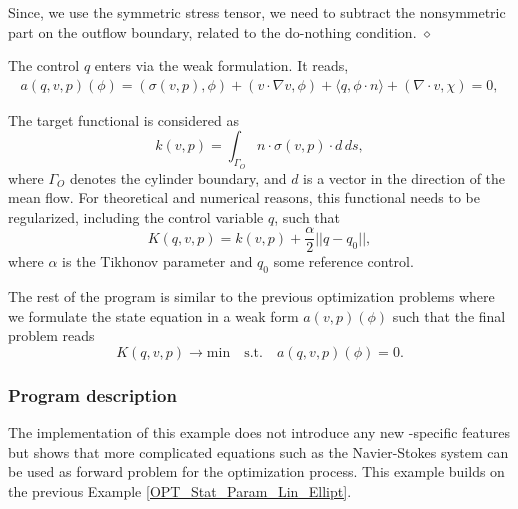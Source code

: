 \begin{remark} Since, we use the 
symmetric stress tensor, we need to subtract the nonsymmetric part 
on the outflow boundary, related to the do-nothing condition.
$\diamond$
\end{remark}

The control $q$ enters via the weak formulation. It reads,
\begin{align*}
a(q,v,p)(\phi) = (\sigma(v,p), \phi) + (v\cdot \nabla v, \phi) 
+ \langle q, \phi\cdot n \rangle + (\nabla\cdot v, \chi) = 0,
\end{align*}




The target functional is considered as 
\[
k(v,p) = \int_{\Gamma_O} n\cdot \sigma(v,p)\cdot d \, ds,
\]
where $\Gamma_O$ denotes the cylinder boundary, and $d$ is a vector in the
direction
of the mean flow. For theoretical and numerical reasons, this functional 
needs to be regularized, including the control variable $q$, such that
\[
K(q,v,p) = k(v,p) + \frac{\alpha}{2}||q - q_0||,
\] 
where $\alpha$ is the Tikhonov parameter and $q_0$ some 
reference control. 

The rest of the program is similar to the previous optimization problems where
we formulate the state equation in a weak form $a(v,p)(\phi)$ such that the 
final problem reads
\[
K(q,v,p) \rightarrow \text{min} \quad \text{s.t.} \quad a(q,v,p)(\phi) = 0.
\]


\subsubsection{Program description}
The implementation of this example does not introduce any new \dope{}-specific
features but shows that more complicated equations such as the Navier-Stokes 
system can be used as forward problem for the optimization process. 
This example builds on the previous Example \ref{OPT_Stat_Param_Lin_Ellipt}.

